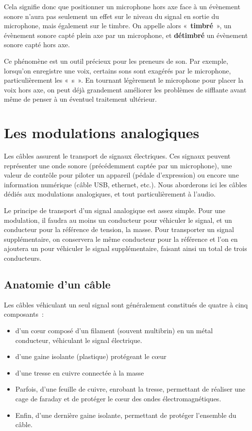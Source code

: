 \documentclass[
]{book}
\providecommand{\tightlist}{%
  \setlength{\itemsep}{0pt}\setlength{\parskip}{0pt}}
\begin{document}
Cela signifie donc que positionner un microphone hors axe face à un évènement sonore n'aura pas seulement un effet sur le niveau du signal en sortie du microphone, mais également sur le timbre. On appelle alors «~\textbf{timbré}~», un évènement sonore capté plein axe par un microphone, et \textbf{détimbré} un évènement sonore capté hors axe.

Ce phénomène est un outil précieux pour les preneurs de son. Par exemple, lorsqu'on enregistre une voix, certains sons sont exagérés par le microphone, particulièrement les «~s~». En tournant légèrement le microphone pour placer la voix hors axe, on peut déjà grandement améliorer les problèmes de sifflante avant même de penser à un éventuel traitement ultérieur.

\hypertarget{les-modulations-analogiques}{%
\chapter{Les modulations analogiques}\label{les-modulations-analogiques}}

Les câbles assurent le transport de signaux électriques. Ces signaux peuvent représenter une onde sonore (précédemment captée par un microphone), une valeur de contrôle pour piloter un appareil (pédale d'expression) ou encore une information numérique (câble USB, ethernet, etc.). Nous aborderons ici les câbles dédiés aux modulations analogiques, et tout particulièrement à l'audio.

Le principe de transport d'un signal analogique est assez simple. Pour une modulation, il faudra au moins un conducteur pour véhiculer le signal, et un conducteur pour la référence de tension, la masse. Pour transporter un signal supplémentaire, on conservera le même conducteur pour la référence et l'on en ajoutera un pour véhiculer le signal supplémentaire, faisant ainsi un total de trois conducteurs.

\hypertarget{anatomie-dun-cuxe2ble}{%
\section{Anatomie d'un câble}\label{anatomie-dun-cuxe2ble}}

Les câbles véhiculant un seul signal sont généralement constitués de quatre à cinq composants~:

\begin{itemize}
\tightlist
\item
  d'un cœur composé d'un filament (souvent multibrin) en un métal conducteur, véhiculant le signal électrique.
\item
  d'une gaine isolante (plastique) protégeant le cœur
\item
  d'une tresse en cuivre connectée à la masse
\item
  Parfois, d'une feuille de cuivre, enrobant la tresse, permettant de réaliser une cage de faraday et de protéger le cœur des ondes électromagnétiques.
\item
  Enfin, d'une dernière gaine isolante, permettant de protéger l'ensemble du câble.
\end{itemize}
\end{document}
